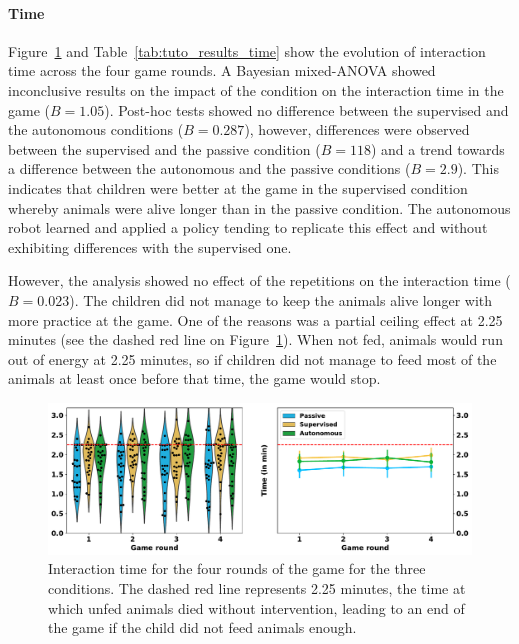 \paragraph{Time}
Figure~\ref{fig:tutoring_time} and Table~\ref{tab:tuto_results_time} show the evolution of interaction time across the four game rounds. A Bayesian mixed-ANOVA showed inconclusive results on the impact of the condition on the interaction time in the game ($B=1.05$). Post-hoc tests showed no difference between the supervised and the autonomous conditions ($B=0.287$), however, differences were observed between the supervised and the passive condition ($B=118$) and a trend towards a difference between the autonomous and the passive conditions ($B=2.9$). This indicates that children were better at the game in the supervised condition whereby animals were alive longer than in the passive condition. The autonomous robot learned and applied a policy tending to replicate this effect and without exhibiting differences with the supervised one.

However, the analysis showed no effect of the repetitions on the interaction time ($B=0.023$). The children did not manage to keep the animals alive longer with more practice at the game. One of the reasons was a partial ceiling effect at 2.25 minutes (see the dashed red line on Figure~\ref{fig:tutoring_time}). When not fed, animals would run out of energy at 2.25 minutes, so if children did not manage to feed most of the animals at least once before that time, the game would stop. 

\begin{figure}[ht]
	\includegraphics[width=1\linewidth]{time.pdf}
	\centering
	\caption{Interaction time for the four rounds of the game for the three conditions. The dashed red line represents 2.25 minutes, the time at which unfed animals died without intervention, leading to an end of the game if the child did not feed animals enough.}
	\label{fig:tutoring_time}
\end{figure}

